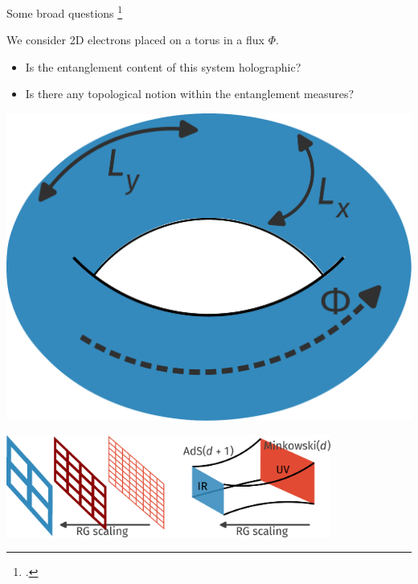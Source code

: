 \documentclass[aspectratio=169,t]{beamer}
\begin{document}
\begin{frame}{Some broad questions}
\footcite{Arias_2015,zaanen_2015}
\begin{minipage}{0.65\textwidth}
We consider 2D electrons placed on a torus in a flux \(\Phi\).
\begin{itemize}
	\item Is the entanglement content of this system \alert{holographic}?\\[10pt]
	\item Is there any \alert{topological} notion within the entanglement measures?
\end{itemize}
\end{minipage}
\hspace*{\fill}
\begin{minipage}{0.3\textwidth}
	\includegraphics[width=\textwidth]{torus.pdf}
\end{minipage}

\vspace*{\fill}
\includegraphics[width=0.8\textwidth]{holography.pdf}
\end{frame}
\end{document}
